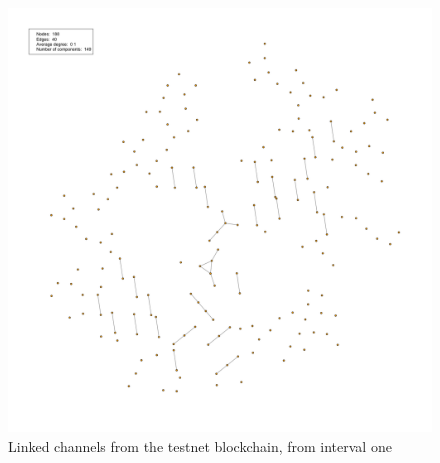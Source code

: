 \begin{figure}[H]
    \centering
    \includegraphics[width=14cm]{figures/graphs/cg_bc_testnet_run1.png}
    \caption{Linked channels from the testnet blockchain, from interval one}
    \label{fig:channel_network_BC_testnet}
\end{figure}
